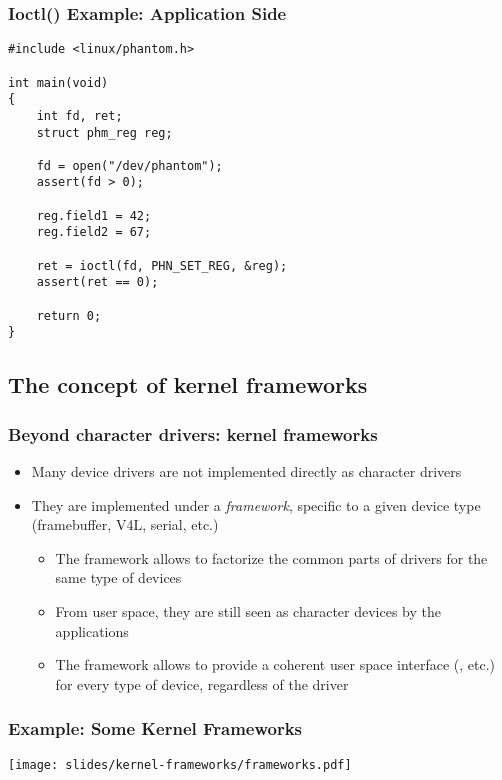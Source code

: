\begin{frame}[fragile]
  \frametitle{Ioctl() Example: Application Side}
\begin{verbatim}
#include <linux/phantom.h>

int main(void)
{
    int fd, ret;
    struct phm_reg reg;

    fd = open("/dev/phantom");
    assert(fd > 0);

    reg.field1 = 42;
    reg.field2 = 67;

    ret = ioctl(fd, PHN_SET_REG, &reg);
    assert(ret == 0);

    return 0;
}
\end{verbatim}
\end{frame}

\subsection{The concept of kernel frameworks}

\begin{frame}
  \frametitle{Beyond character drivers: kernel frameworks}
  \begin{itemize}
  \item Many device drivers are not implemented directly as character
    drivers
  \item They are implemented under a \emph{framework}, specific to a
    given device type (framebuffer, V4L, serial, etc.)
    \begin{itemize}
    \item The framework allows to factorize the common parts of
      drivers for the same type of devices
    \item From user space, they are still seen as character devices by
      the applications
    \item The framework allows to provide a coherent user space
      interface (, etc.) for every type of device,
      regardless of the driver
    \end{itemize}
  \end{itemize}
\end{frame}

\begin{frame}
  \frametitle{Example: Some Kernel Frameworks}
  \begin{center}
    \texttt{[image: slides/kernel-frameworks/frameworks.pdf]}
  \end{center}
\end{frame}


